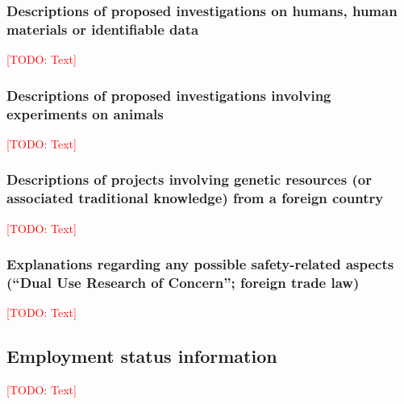 \documentclass[american,firsttime]{dfgproposal}
\newcommand{\todo}[1]{\xspace{\textcolor{red}{[TODO: #1]}}\xspace}
\begin{document}
	\subsubsection{Descriptions of proposed investigations on humans, human materials or identifiable data}
	\todo{Text}
	
	\subsubsection{Descriptions of proposed investigations involving experiments on animals}
	\todo{Text}
	
	\subsubsection{Descriptions of projects involving genetic resources (or associated traditional knowledge) from a foreign country}
	\todo{Text}
	
	\subsubsection{Explanations regarding any possible safety-related aspects (\enquote{Dual Use Research of Concern}; foreign trade law)}
	\todo{Text}
	
	
	\subsection{Employment status information}
	\todo{Text}
	
\end{document}
